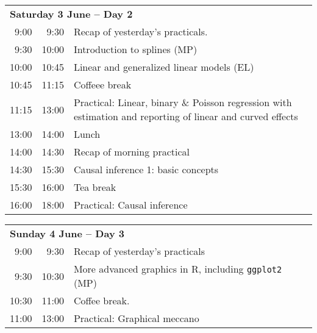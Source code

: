 \noindent
\begin{tabular}{r@{ -- }rp{13cm}}
\multicolumn{3}{l}{\bf Saturday 3 June -- Day 2} \\
 9:00 &  9:30 & Recap of yesterday's practicals. \\
 9:30 & 10:00 & Introduction to splines (MP)\\ %
10:00 & 10:45 & Linear and generalized linear models (EL)\\ %
10:45 & 11:15 & Coffeee break \\
11:15 & 13:00 & Practical: Linear, binary \& Poisson regression  
                with estimation and reporting of linear and curved
                effects\\ %
13:00 & 14:00 & Lunch \\
14:00 & 14:30 & Recap of morning practical \\
14:30 & 15:30 & Causal inference 1: basic concepts\\ %
15:30 & 16:00 & Tea break\\
16:00 & 18:00 & Practical: Causal inference\\[1em] %
\end{tabular}

\noindent
\begin{tabular}{r@{ -- }rp{13cm}}
 \multicolumn{3}{l}{\bf Sunday 4 June -- Day 3} \\
 9:00 &  9:30 & Recap of yesterday's practicals \\
 9:30 & 10:30 & More advanced graphics in R, including
                \texttt{ggplot2} (MP)\\ %
10:30 & 11:00 & Coffee break. \\
11:00 & 13:00 & Practical: Graphical meccano \\[1em] %
\end{tabular}

